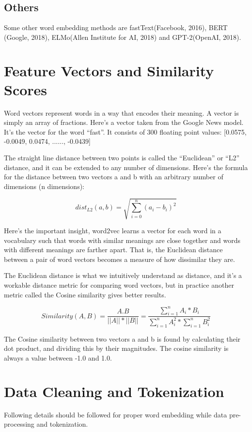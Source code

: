 \subsection{Others}
Some other word embedding methods are fastText(Facebook, 2016), BERT (Google, 2018), ELMo(Allen Institute for AI, 2018) and GPT-2(OpenAI, 2018).

\section{Feature Vectors and Similarity Scores}

Word vectors represent words in a way that encodes their meaning. A vector is simply an array of fractions. Here\rq s a vector taken from the Google News model. It\rq s the vector for the word “fast”. It consists of 300 floating point values: [0.0575, -0.0049, 0.0474, ......, -0.0439]

The straight line distance between two points is called the “Euclidean” or “L2” distance, and it can be extended to any number of dimensions. Here\rq s the formula for the distance between two vectors a and b with an arbitrary number of dimensions (n dimensions):

\begin{equation}
    dist_{L2}(a, b) = \sqrt{\sum_{i = 0}^{n} (a_i - b_i)^2}
\end{equation}


Here\rq s the important insight, word2vec learns a vector for each word in a vocabulary such that words with similar meanings are close together and words with different meanings are farther apart. That is, the Euclidean distance between a pair of word vectors becomes a measure of how dissimilar they are.

The Euclidean distance is what we intuitively understand as distance, and it\rq s a workable distance metric for comparing word vectors, but in practice another metric called the Cosine similarity gives better results.

\begin{equation}
    Similarity(A, B) = \frac{A.B}{|| A || * || B ||} = \frac{\sum_{i = 1}^{n} A_i * B_i}{\sum_{i = 1}^n A_i^2 * \sum_{i = 1}^n B_i^2}
\end{equation}

The Cosine similarity between two vectors a and b is found by calculating their dot product, and dividing this by their magnitudes. The cosine similarity is always a value between -1.0 and 1.0.

\section{Data Cleaning and Tokenization}
Following details should be followed for proper word embedding while data pre-processing and tokenization.

